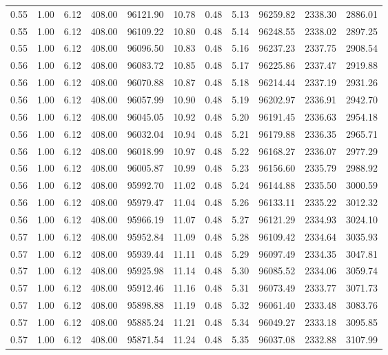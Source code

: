 \begin{table}[!ht]
\begin{tabular}{rrrrrrrrrrr}
0.55 & 1.00 & 6.12 & 408.00 & 96121.90 & 10.78 & 0.48 & 5.13 & 96259.82 & 2338.30 & 2886.01 \\
0.55 & 1.00 & 6.12 & 408.00 & 96109.22 & 10.80 & 0.48 & 5.14 & 96248.55 & 2338.02 & 2897.25 \\
0.55 & 1.00 & 6.12 & 408.00 & 96096.50 & 10.83 & 0.48 & 5.16 & 96237.23 & 2337.75 & 2908.54 \\
0.56 & 1.00 & 6.12 & 408.00 & 96083.72 & 10.85 & 0.48 & 5.17 & 96225.86 & 2337.47 & 2919.88 \\
0.56 & 1.00 & 6.12 & 408.00 & 96070.88 & 10.87 & 0.48 & 5.18 & 96214.44 & 2337.19 & 2931.26 \\
0.56 & 1.00 & 6.12 & 408.00 & 96057.99 & 10.90 & 0.48 & 5.19 & 96202.97 & 2336.91 & 2942.70 \\
0.56 & 1.00 & 6.12 & 408.00 & 96045.05 & 10.92 & 0.48 & 5.20 & 96191.45 & 2336.63 & 2954.18 \\
0.56 & 1.00 & 6.12 & 408.00 & 96032.04 & 10.94 & 0.48 & 5.21 & 96179.88 & 2336.35 & 2965.71 \\
0.56 & 1.00 & 6.12 & 408.00 & 96018.99 & 10.97 & 0.48 & 5.22 & 96168.27 & 2336.07 & 2977.29 \\
0.56 & 1.00 & 6.12 & 408.00 & 96005.87 & 10.99 & 0.48 & 5.23 & 96156.60 & 2335.79 & 2988.92 \\
0.56 & 1.00 & 6.12 & 408.00 & 95992.70 & 11.02 & 0.48 & 5.24 & 96144.88 & 2335.50 & 3000.59 \\
0.56 & 1.00 & 6.12 & 408.00 & 95979.47 & 11.04 & 0.48 & 5.26 & 96133.11 & 2335.22 & 3012.32 \\
0.56 & 1.00 & 6.12 & 408.00 & 95966.19 & 11.07 & 0.48 & 5.27 & 96121.29 & 2334.93 & 3024.10 \\
0.57 & 1.00 & 6.12 & 408.00 & 95952.84 & 11.09 & 0.48 & 5.28 & 96109.42 & 2334.64 & 3035.93 \\
0.57 & 1.00 & 6.12 & 408.00 & 95939.44 & 11.11 & 0.48 & 5.29 & 96097.49 & 2334.35 & 3047.81 \\
0.57 & 1.00 & 6.12 & 408.00 & 95925.98 & 11.14 & 0.48 & 5.30 & 96085.52 & 2334.06 & 3059.74 \\
0.57 & 1.00 & 6.12 & 408.00 & 95912.46 & 11.16 & 0.48 & 5.31 & 96073.49 & 2333.77 & 3071.73 \\
0.57 & 1.00 & 6.12 & 408.00 & 95898.88 & 11.19 & 0.48 & 5.32 & 96061.40 & 2333.48 & 3083.76 \\
0.57 & 1.00 & 6.12 & 408.00 & 95885.24 & 11.21 & 0.48 & 5.34 & 96049.27 & 2333.18 & 3095.85 \\
0.57 & 1.00 & 6.12 & 408.00 & 95871.54 & 11.24 & 0.48 & 5.35 & 96037.08 & 2332.88 & 3107.99 \\

\end{tabular}
\end{table}
